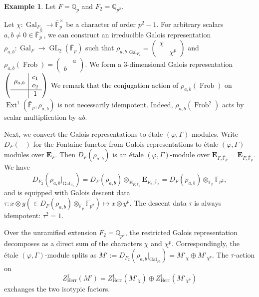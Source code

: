 \documentclass[11pt]{amsart}
\newcommand{\MINOREDITED}[1]{#1}
\theoremstyle{definition}
\newtheorem{example}[thm]{Example}
\newcommand{\Q}{\mathbb{Q}}
\newcommand{\F}{\mathbb{F}}
\newcommand{\bfE}{\mathbf{E}}
\newcommand{\Ext}{{\operatorname{Ext}}}
\newcommand{\bFp}{\bar{\mathbb{F}}_p}
\DeclareMathOperator{\Frob}{Frob}
\DeclareMathOperator{\GL}{GL}
\DeclareMathOperator{\Gal}{Gal}
\newcommand{\Herr}{\mathrm{Herr}}
\begin{document}
\begin{example}
Let $F=\Q_p$ and $F_2=\Q_{p^2}$.

Let $\chi:\Gal_{F_2}\to \bFp^\times$ be a
character of order \MINOREDITED{$p^2-1$}.
For arbitrary scalars $a,b\neq 0\in \bFp^\times$,
we can construct an irreducible Galois representation
$\rho_{a,b}:\Gal_{\MINOREDITED{F}}\to \GL_2(\bFp)$
such that
$\rho_{a,b}|_{\Gal_{F_2}}=
\begin{pmatrix}
\chi & \\ & \chi^p
\end{pmatrix}
$
and $\rho_{a,b}(\Frob)=
\begin{pmatrix}
& a \\ b & 
\end{pmatrix}
$.
We form a $3$-dimensional Galois representation
$
\left(
\begin{array}{c|c}
\rho_{a,b} & 
\begin{matrix}
c_1 \\
c_2
\end{matrix}
\\
\hline
& 1
\end{array}
\right)
$
We remark that
the conjugation action
of $\rho_{a,b}(\Frob)$ on
$\Ext^1(\MINOREDITED{\bFp,\rho_{a,b}})$
is not necessarily idempotent.
Indeed, $\rho_{a,b}(\Frob^2)$ acts
by scalar multiplication by $ab$.

Next, we convert the Galois representations
to \'etale $(\varphi, \Gamma)$-modules.
Write $D_F(-)$ for the Fontaine functor
from Galois representations to \'etale
$(\varphi, \Gamma)$-modules over $\bfE_{F}$.
Then $D_F(\rho_{a,b})$
is an \'etale $(\varphi, \Gamma)$-module
over $\bfE_{F, \bFp}=\bfE_{F,\bFp}$.
We have
\[
D_{F_2}(\rho_{a,b}|_{\Gal_{F_2}})
=D_F(\rho_{a,b}) \otimes_{\bfE_{F,\bFp}}\bfE_{F_2,\bFp}
=D_F(\rho_{a,b})\otimes_{\F_p}\F_{p^2},
\]
and is equipped with Galois
descent data
$\tau: x\otimes y (\in D_F(\rho_{a,b})\otimes_{\F_p}\F_{p^2})
\mapsto x\otimes y^p$.
The descent data $\tau$ is always idempotent:
$\tau^2=1$.

Over the unramified extension $F_2 = \Q_{p^2}$, the restricted Galois representation decomposes as a direct sum of the characters $\chi$ and $\chi^p$. Correspondingly, the \'etale $(\varphi, \Gamma)$-module splits as 
$M' := D_{F_2}(\rho_{a,b}|_{\Gal_{F_2}}) = M'_\chi \oplus M'_{\chi^p}$.
The $\tau$-action on
$$Z^1_{\Herr}(M') = Z^1_{\Herr}(M'_\chi) \oplus Z^1_{\Herr}(M'_{\chi^p})$$
exchanges the two isotypic factors.



\end{example}
\end{document}

